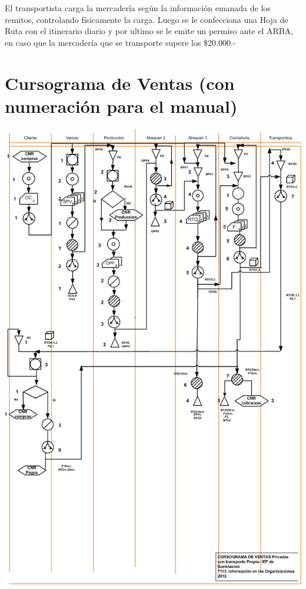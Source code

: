 \begin{description}
	El transportista carga la mercader\'ia seg\'un la informaci\'on emanada de los remitos, controlando f\'isicamente la carga.  Luego se le confecciona una Hoja de Ruta con el itinerario diario y por ultimo se le emite un permiso ante el ARBA, en caso que la mercader\'ia que se transporte supere los \$20.000.-   
\end{description}

\pagebreak
\section{Cursograma de Ventas (con numeración para el manual)}
\begin{center}
 \includegraphics[scale=0.78,keepaspectratio=true]{Empresa/Circuitos/Ventas/Ventas-manual.jpg}
\end{center}

